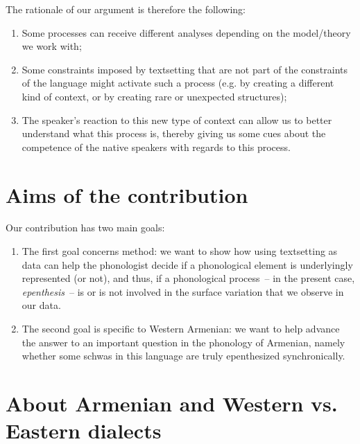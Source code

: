 \documentclass[output=paper,colorlinks,citecolor=brown]{langscibook}
\begin{document}
The rationale of our argument is therefore the following: 

\begin{enumerate}
\item Some processes can receive different analyses depending on the model\slash theory we work with; 
\item Some constraints imposed by textsetting that are not part of the constraints of the language might activate such a process (e.g. by creating a different kind of context, or by creating rare or unexpected structures); 
\item The speaker’s reaction to this new type of context can allow us to better understand what this process is, thereby giving us some cues about the competence of the native speakers with regards to this process.
\end{enumerate}

\section{Aims of the contribution}
Our contribution has two main goals: 
\begin{enumerate}
    \item The first goal concerns method: we want to show how using textsetting as data can help the phonologist decide if a phonological element is underlyingly represented (or not), and thus, if a phonological process~-- in the present case, \textit{epenthesis}~-- is or is not involved in the surface variation that we observe in our data.
    \item The second goal is specific to Western Armenian: we want to help advance the answer to an important question in the phonology of Armenian, namely whether some schwas in this language are truly epenthesized synchronically.
\end{enumerate}


\section{About Armenian and Western vs. Eastern dialects}
\end{document}
